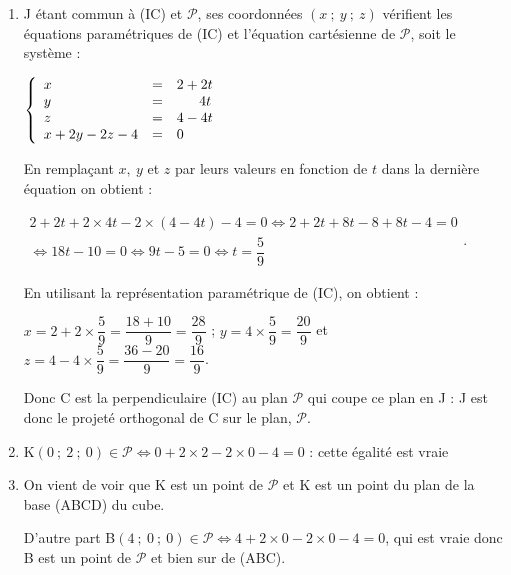 \begin{enumerate}
\begin{enumerate}
$M(x~;~y~;~z) \in \mathcal{P} \iff 2x + 4y - 4z + d = 0$, avec $d \in \R$.

Ainsi G(4~;~4~;~4) $\in \mathcal{P} \iff 2 \times 4 + 4 \times 4 - 4 \times 4 + d = 0 \iff d = - 8$.

On a donc $M(x~;~y~;~z) \in \mathcal{P} \iff 2x + 4y - 4z - 8 = 0 \iff x + 2y - 2z - 4 = 0$.


		\item 
		

J étant commun à (IC) et $\mathcal{P}$, ses coordonnées $(x~;~y~;~z)$ vérifient les équations paramétriques de (IC) et l'équation cartésienne de $\mathcal{P}$, soit le système :

$\left\{\begin{array}{l c l}
x &=&2+2t\\
y &=&\phantom{2 +~}4t\\
z &=&4 - 4t\\
x + 2y - 2z - 4 &=& 0
\end{array}\right.$ 

En remplaçant $x,\:y$ et $z$ par leurs valeurs en fonction de $t$ dans la dernière équation on obtient :

$\begin{gathered}2+2t + 2\times 4t - 2\times (4 - 4t) - 4 = 0 \iff 2 + 2t + 8t - 8  + 8t - 4 = 0\\
\iff 18t - 10 = 0\iff 9t - 5 = 0 \iff t = \dfrac{5}{9}\end{gathered}$.

En utilisant la représentation paramétrique de (IC), on obtient :

$x = 2 + 2\times \dfrac{5}{9} = \dfrac{18 + 10}{9} = \dfrac{28}{9}$ ; $y = 4 \times \dfrac59 = \dfrac{20}{9}$ et $z = 4 - 4\times \dfrac59 = \dfrac{36 - 20}{9} = \dfrac{16}{9}$.

Donc C est la perpendiculaire (IC) au plan $\mathcal{P}$ qui coupe ce plan en J : J est donc le projeté orthogonal de C sur le plan, $\mathcal{P}$.

		\item 
K$(0~;~2~;~0) \in \mathcal{P} \iff 0 + 2 \times 2 - 2\times 0 - 4 = 0$ : cette égalité est vraie

		\item 
On vient de voir que K est un point de $\mathcal{P}$ et K est un point du plan de la base (ABCD) du cube.

D'autre part B$(4~;~0~;~0) \in \mathcal{P} \iff 4 + 2 \times 0 - 2 \times 0 - 4 = 0$, qui est vraie donc B est un point de $\mathcal{P}$ et bien sur de (ABC).


\end{enumerate}
\end{enumerate}
